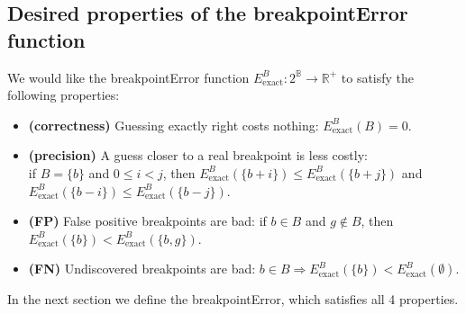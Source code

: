 \documentclass{jsfds} %
\newcommand{\RR}{\mathbb{R}}
\begin{document}
\subsection{Desired properties of the breakpointError function}
\label{sec:desired-properties}

We would like the breakpointError function $E^B_{\text{exact}}:
2^{\mathbb B}\rightarrow \RR^+$ to satisfy the following properties:

\begin{itemize}
\item \textbf{(correctness)} Guessing exactly right costs nothing:
  $E^B_{\text{exact}}(B)=0$.
\item \textbf{(precision)} A guess closer to a real breakpoint is less
  costly:\\if $B=\{b\}$ and $0\leq i<j$, then
  $E^B_{\text{exact}}(\{b+i\})\leq E^B_{\text{exact}}(\{b+j\})$ and
  $E^B_{\text{exact}}(\{b-i\})\leq E^B_{\text{exact}}(\{b-j\})$.
\item \textbf{(FP)} False positive breakpoints are
  bad: if $b\in B$ and $g\not\in B$, then $E^B_{\text{exact}} (\{b\}) <
  E^B_{\text{exact}} (\{b,g\})$.
\item \textbf{(FN)} Undiscovered breakpoints are bad:
  $b\in B\Rightarrow E^B_{\text{exact}}(\{b\}) < E^B_{\text{exact}} (\emptyset)$.
\end{itemize}

In the next section we define the breakpointError, which satisfies all
4 properties. 


\end{document}
